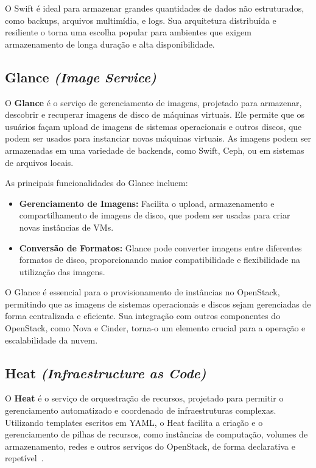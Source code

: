 O Swift é ideal para armazenar grandes quantidades de dados não estruturados, como backups, arquivos multimídia, e logs. Sua arquitetura distribuída e resiliente o torna uma escolha popular para ambientes que exigem armazenamento de longa duração e alta disponibilidade.

\subsection{Glance \textit{(Image Service)}}

O \textbf{Glance} é o serviço de gerenciamento de imagens, projetado para armazenar, descobrir e recuperar imagens de disco de máquinas virtuais. Ele permite que os usuários façam upload de imagens de sistemas operacionais e outros discos, que podem ser usados para instanciar novas máquinas virtuais. As imagens podem ser armazenadas em uma variedade de backends, como Swift, Ceph, ou em sistemas de arquivos locais.

As principais funcionalidades do Glance incluem:

\begin{itemize}
    \item \textbf{Gerenciamento de Imagens:} Facilita o upload, armazenamento e compartilhamento de imagens de disco, que podem ser usadas para criar novas instâncias de VMs.
    \item \textbf{Conversão de Formatos:} Glance pode converter imagens entre diferentes formatos de disco, proporcionando maior compatibilidade e flexibilidade na utilização das imagens.
\end{itemize}

O Glance é essencial para o provisionamento de instâncias no OpenStack, permitindo que as imagens de sistemas operacionais e discos sejam gerenciadas de forma centralizada e eficiente. Sua integração com outros componentes do OpenStack, como Nova e Cinder, torna-o um elemento crucial para a operação e escalabilidade da nuvem.

\subsection{Heat \textit{(Infraestructure as Code)}}

O \textbf{Heat} é o serviço de orquestração de recursos, projetado para permitir o gerenciamento automatizado e coordenado de infraestruturas complexas. Utilizando templates escritos em YAML, o Heat facilita a criação e o gerenciamento de pilhas de recursos, como instâncias de computação, volumes de armazenamento, redes e outros serviços do OpenStack, de forma declarativa e repetível~\citep{OpenStackHeat}.

